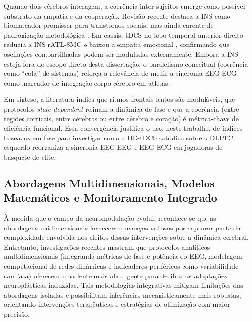 Quando dois cérebros interagem, a coerência inter-sujeitos emerge como possível substrato da empatia e da cooperação. Revisão recente destaca a INS como biomarcador promissor para transtornos sociais, mas ainda carente de padronização metodológica \cite{konrad2024interpersonal}. Em casais, tDCS no lobo temporal anterior direito reduziu a INS rATL-SMC e baixou a empatia emocional \cite{long2023transcranial}, confirmando que oscilações compartilhadas podem ser moduladas externamente. Embora a INS esteja fora do escopo direto desta dissertação, o paralelismo conceitual (coerência como ``cola'' de sistemas) reforça a relevância de medir a sincronia EEG-ECG como marcador de integração corpo-cérebro em atletas.

Em síntese, a literatura indica que ritmos frontais lentos são moduláveis, que protocolos \textit{state-dependent} refinam a dinâmica de fase e que a coerência (entre regiões corticais, entre cérebros ou entre cérebro e coração) é métrica-chave de eficiência funcional. Essa convergência justifica o uso, neste trabalho, de índices baseados em fase para investigar como a HD-tDCS catódica sobre o DLPFC esquerdo reorganiza a sincronia EEG-EEG e EEG-ECG em jogadoras de basquete de elite.

\subsection{Abordagens Multidimensionais, Modelos Matemáticos e Monitoramento Integrado}
À medida que o campo da neuromodulação evolui, reconhece-se que as abordagens unidimensionais forneceram avanços valiosos por capturar parte da complexidade envolvida nos efeitos dessas intervenções sobre a dinâmica cerebral. Entretanto, investigações recentes mostram que protocolos analíticos multidimensionais (integrando métricas de fase e potência do EEG, modelagem computacional de redes dinâmicas e indicadores periféricos como variabilidade cardíaca) oferecem uma lente mais abrangente para decifrar as adaptações neuroplásticas induzidas. Tais metodologias integrativas mitigam limitações das abordagens isoladas e possibilitam inferências mecanisticamente mais robustas, orientando intervenções terapêuticas e estratégias de otimização com maior precisão.

